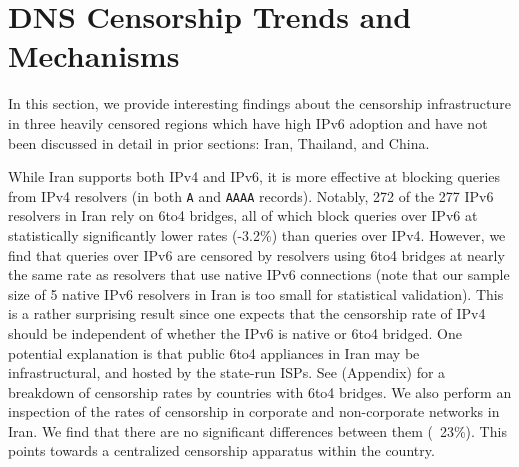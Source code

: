 \section{DNS Censorship Trends and Mechanisms}
\label{sec:cases}
In this section, we provide interesting findings about the censorship
infrastructure in three heavily censored regions which have high IPv6 adoption
and have not been discussed in detail in prior sections: Iran, Thailand, and
China.

% 

While Iran supports both IPv4 and IPv6, it is more effective at blocking queries
from IPv4 resolvers (in both \texttt{A} and \texttt{AAAA} records). Notably, 272
of the 277 IPv6 resolvers in Iran rely on 6to4 bridges, all of which block
queries over IPv6 at statistically significantly lower rates (-3.2\%) than
queries over IPv4. 
%
However, we find that queries over IPv6 are censored by resolvers using 6to4
bridges at nearly the same rate as resolvers that use native IPv6 connections
(note that our sample size of 5 native IPv6 resolvers in Iran is too small for
statistical validation). This is a rather surprising result since one expects
that the censorship rate of IPv4 should be independent of whether the IPv6 is
native or 6to4 bridged. One potential explanation is that public 6to4
appliances in Iran may be infrastructural, and hosted by the state-run ISPs.
See  (Appendix) for a breakdown of
censorship rates by countries with 6to4 bridges.
%
We also perform an inspection of the rates of censorship in corporate and
non-corporate networks in Iran. We find that there are no significant
differences between them (~23\%). This points towards a centralized censorship
apparatus within the country.

